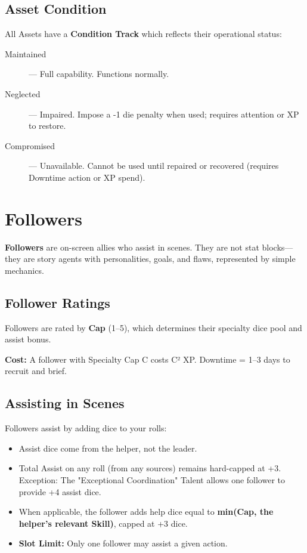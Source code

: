 \subsection*{Asset Condition}

All Assets have a \textbf{Condition Track} which reflects their operational status:

\begin{description}
  \item[Maintained]  — Full capability. Functions normally.
  \item[Neglected]  — Impaired. Impose a -1 die penalty when used; requires attention or XP to restore.
  \item[Compromised]  — Unavailable. Cannot be used until repaired or recovered (requires Downtime action or XP spend).
\end{description}

\section{Followers}

\textbf{Followers} are on-screen allies who assist in scenes. They are not stat blocks—they are story agents with personalities, goals, and flaws, represented by simple mechanics.

\subsection*{Follower Ratings}

Followers are rated by \textbf{Cap} (1–5), which determines their specialty dice pool and assist bonus.

\textbf{Cost:} A follower with Specialty Cap C costs C² XP. Downtime = 1–3 days to recruit and brief.

\subsection*{Assisting in Scenes}

Followers assist by adding dice to your rolls:

\begin{itemize}
  \item Assist dice come from the helper, not the leader.
  \item Total Assist on any roll (from any sources) remains hard-capped at +3. Exception: The "Exceptional Coordination"  Talent allows one follower to provide +4 assist dice.
  \item When applicable, the follower adds help dice equal to \textbf{min(Cap, the helper's relevant Skill)}, capped at +3 dice.
  \item \textbf{Slot Limit:} Only one follower may assist a given action.
\end{itemize}

